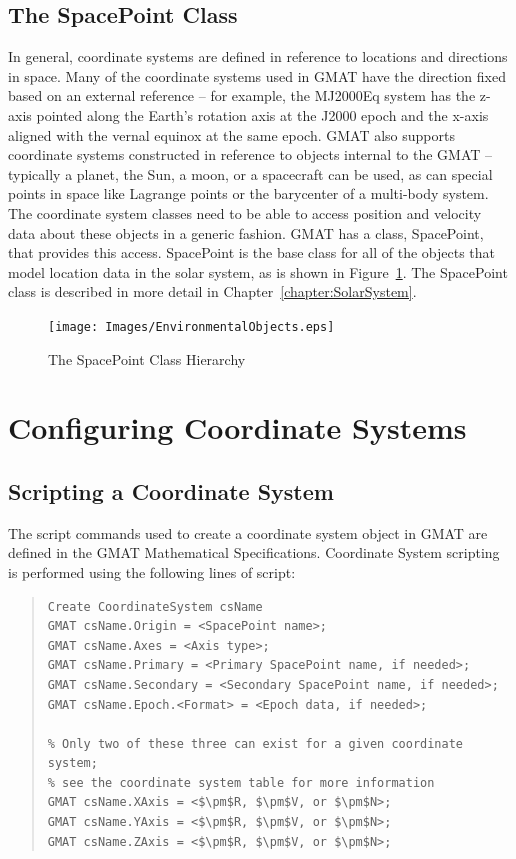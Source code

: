 \subsection{\label{sub:SpacePointClassDescription}The SpacePoint Class}

In general, coordinate systems are defined in reference to locations and directions in space. Many
of the coordinate systems used in GMAT have the direction fixed based on an external reference --
for example, the MJ2000Eq system has the z-axis pointed along the Earth's rotation axis at the J2000
epoch and the x-axis aligned with the vernal equinox at the same epoch. GMAT also supports
coordinate systems constructed in reference to objects internal to the GMAT -- typically a planet,
the Sun, a moon, or a spacecraft can be used, as can special points in space like Lagrange points or
the barycenter of a multi-body system.  The coordinate system classes need to be able to access
position and velocity data about these objects in a generic fashion. GMAT has a class, SpacePoint,
that provides this access. SpacePoint is the base class for all of the objects that model location
data in the solar system, as is shown in Figure~\ref{figure:SpacePointHierarchy}.  The SpacePoint
class is described in more detail in Chapter~\ref{chapter:SolarSystem}.

\begin{figure}
\begin{center}
\texttt{[image: Images/EnvironmentalObjects.eps]}
\caption{\label{figure:SpacePointHierarchy}The SpacePoint Class Hierarchy}
\end{center}
\end{figure}

\section{\label{sec:CSScriptConfiguration}Configuring Coordinate Systems}

\subsection{Scripting a Coordinate System}

The script commands used to create a coordinate system object in GMAT are defined in the GMAT
Mathematical Specifications\cite{mathSpec}.  Coordinate System scripting is performed using the
following lines of script:

\begin{quotation}
\begin{verbatim}
Create CoordinateSystem csName
GMAT csName.Origin = <SpacePoint name>;
GMAT csName.Axes = <Axis type>;
GMAT csName.Primary = <Primary SpacePoint name, if needed>;
GMAT csName.Secondary = <Secondary SpacePoint name, if needed>;
GMAT csName.Epoch.<Format> = <Epoch data, if needed>;

% Only two of these three can exist for a given coordinate system;
% see the coordinate system table for more information
GMAT csName.XAxis = <$\pm$R, $\pm$V, or $\pm$N>;
GMAT csName.YAxis = <$\pm$R, $\pm$V, or $\pm$N>;
GMAT csName.ZAxis = <$\pm$R, $\pm$V, or $\pm$N>;
\end{verbatim}
\end{quotation}

